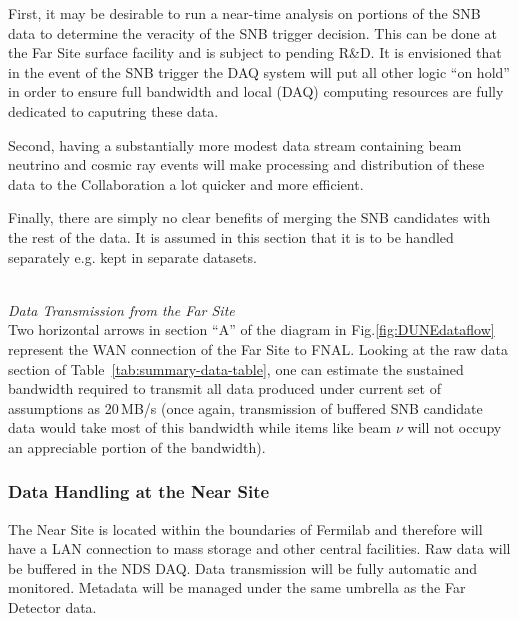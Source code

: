 First, it may be desirable to run a near-time
analysis on portions of the SNB data to determine the veracity of the SNB trigger decision. This can be done at the Far Site surface facility
and is subject to pending R\&D.
It is envisioned that in the event of the SNB trigger the DAQ system will put all other logic ``on hold''
in order to ensure full bandwidth and local (DAQ) computing resources are fully dedicated to caputring these data.

Second, having a substantially more modest data stream containing beam neutrino and cosmic ray
events will make processing and distribution of these data to the Collaboration a lot quicker and more efficient.

Finally, there are simply 
no clear benefits of merging the SNB candidates with the rest of the data. It is assumed in this section that it is to be handled
separately e.g. kept in separate datasets.

\ 
\\

\noindent
\textit{Data Transmission from the Far Site} 
\ 
\\
\noindent
Two horizontal arrows in section ``A'' of the diagram in Fig.\ref{fig:DUNEdataflow} represent the WAN connection of
the Far Site to FNAL. Looking at the raw data section of Table~\ref{tab:summary-data-table}, one can estimate
the sustained bandwidth required to transmit all data produced under current set of assumptions as 20\,MB/s (once
again, transmission of buffered SNB candidate data would take most of this bandwidth while items like beam $\nu$
will not occupy an appreciable portion of the bandwidth).

\subsubsection{Data Handling at the Near Site}

The Near Site is located within the boundaries of Fermilab and therefore will have a LAN connection to mass storage
and other central facilities. Raw data will be buffered in the NDS DAQ. Data transmission will be fully automatic and monitored.
Metadata will be managed under the same umbrella as the Far Detector data.


